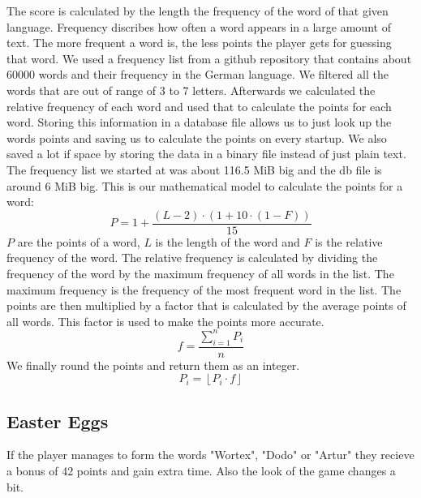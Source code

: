 \documentclass{article}[12pt]
\begin{document}
    The score is calculated by the length the frequency of the word of that
    given language. Frequency discribes how often a word appears in a large
    amount of text. The more frequent a word is, the less points the player
    gets for guessing that word. We used a frequency list from a github
    repository that contains about 60000 words and their frequency in the
    German language. We filtered all the words that are out of range of 3 to 7
    letters. Afterwards we calculated the relative frequency of each word and
    used that to calculate the points for each word. Storing this information
    in a database file allows us to just look up the words points and saving us
    to calculate the points on every startup. We also saved a lot if space by
    storing the data in a binary file instead of just plain text. The frequency
    list we started at was about 116.5 MiB big and the db file is around 6 MiB
    big. This is our mathematical model to calculate the points for a word:
    \begin{equation}
       P = 1 + \frac{(L - 2) \cdot (1 + 10 \cdot (1 - F))}{15} 
    \end{equation}
    \noindent
    $P$ are the points of a word, $L$ is the length of the word and $F$
    is the relative frequency of the word. The relative frequency is calculated
    by dividing the frequency of the word by the maximum frequency of all words
    in the list. The maximum frequency is the frequency of the most frequent
    word in the list. The points are then multiplied by a factor that is
    calculated by the average points of all words. This factor is used to make
    the points more accurate.  
    \begin{equation}
        f = \frac{\sum_{i=1}^{n} P_i}{n}
    \end{equation}
    We finally round the points and return them as an integer.
    \begin{equation}
        P_i = \left\lfloor P_i \cdot f \right\rfloor
    \end{equation}

    \subsection*{Easter Eggs}

    If the player manages to form the words "Wortex", "Dodo" or "Artur" they
    recieve a bonus of 42 points and gain extra time. Also the look of the game
    changes a bit.
\end{document}

